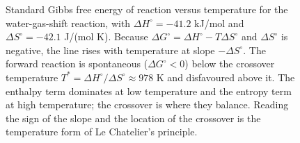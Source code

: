 \begin{figure}[htbp]
\centering
{}
\caption[Gibbs free energy versus temperature for the water-gas-shift
reaction]{Standard Gibbs free energy of reaction versus temperature for the
water-gas-shift reaction, with $\Delta H^\circ=-41.2$ kJ/mol and
$\Delta S^\circ=-42.1$ J/(mol K). Because $\Delta G^\circ=\Delta H^\circ-
T\Delta S^\circ$ and $\Delta S^\circ$ is negative, the line rises with
temperature at slope $-\Delta S^\circ$. The forward reaction is spontaneous
($\Delta G^\circ<0$) below the crossover temperature
$T^\ast=\Delta H^\circ/\Delta S^\circ\approx978$ K and disfavoured above it.
The enthalpy term dominates at low temperature and the entropy term at high
temperature; the crossover is where they balance. Reading the sign of the slope
and the location of the crossover is the temperature form of Le Chatelier's
principle.}
\label{fig:vol04ch04:gibbs-temperature}
\end{figure}
